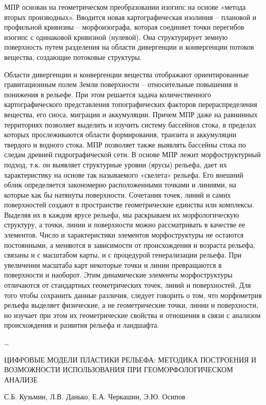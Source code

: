 \documentclass[runningheads]{AIIT}
\begin{document}
 МПР основан на геометрическом преобразовании изогипс на основе «метода вторых производных». Вводится новая картографическая изолиния – плановой и профильной кривизны – морфоизографа, которая соединяет точки перегибов изогипс с одинаковой кривизной (нулевой). Она структурирует земную поверхность путем разделения на области дивергенции и конвергенции потоков вещества, создающие потоковые структуры.

Области дивергенции и конвергенции вещества отображают ориентированные гравитационным полем Земли поверхности – относительные повышения и понижения в рельефе. При этом решается задача количественного картографического представления топографических факторов перераспределения вещества, его сноса, миграции и аккумуляции. Причем МПР даже на равнинных территориях позволяет выделить и изучить систему бассейнов стока, в пределах которых прослеживаются области формирования, транзита и аккумуляции твердого и водного стока. МПР позволяет также выявлять бассейны стока по следам древней гидрографической сети.
В основе МПР лежит морфоструктурный подход, т.к. он выявляет структурные уровни (ярусы) рельефа, дает их характеристику на основе так называемого «скелета» рельефа. Его внешний облик определяется закономерно расположенными точками и линиями, на которые как бы натянуты поверхности. Сочетания точек, линий и самих поверхностей создают в пространстве геометрические единства или комплексы. Выделяя их в каждом   ярусе рельефа, мы раскрываем их морфологическую структуру, а точки, линии и поверхности можно рассматривать в качестве ее элементов.
Число и характеристики элементов морфоструктуры не остаются постоянными, а меняются в зависимости от происхождения и возраста рельефа, связаны и с масштабом карты, и с процедурой генерализации рельефа. При увеличении масштаба карт некоторые точки и линии превращаются в поверхности и наоборот. Этим динамические элементы морфоструктуры отличаются от стандартных геометрических точек, линий и поверхностей. Для того чтобы сохранить данные различия, следует говорить о том, что морфометрия рельефа выделяет физические, а не геометрические точки, линии и поверхности, но изучает при этом их геометрические свойства и отношения в связи с анализом происхождения и развития рельефа и ландшафта.

…

ЦИФРОВЫЕ МОДЕЛИ ПЛАСТИКИ РЕЛЬЕФА:
МЕТОДИКА ПОСТРОЕНИЯ И ВОЗМОЖНОСТИ ИСПОЛЬЗОВАНИЯ ПРИ ГЕОМОРФОЛОГИЧЕСКОМ АНАЛИЗЕ

С.Б. Кузьмин, Л.В. Данько, Е.А. Черкашин, Э.Ю. Осипов
\end{document}
